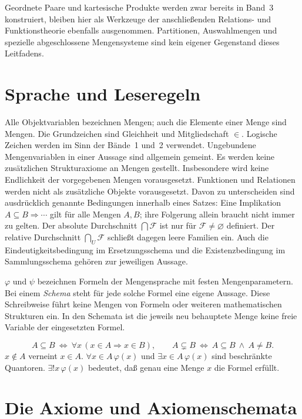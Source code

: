 Geordnete Paare und kartesische Produkte werden zwar bereits in Band~3
konstruiert, bleiben hier als Werkzeuge der anschließenden
Relations- und Funktionstheorie ebenfalls ausgenommen.
Partitionen, Auswahlmengen und spezielle abgeschlossene
Mengensysteme sind kein eigener Gegenstand dieses Leitfadens.

\section{Sprache und Leseregeln}

Alle Objektvariablen bezeichnen Mengen; auch die Elemente einer Menge
sind Mengen. Die Grundzeichen sind Gleichheit und Mitgliedschaft
$\in$. Logische Zeichen werden im Sinn der Bände~1 und~2 verwendet.
Ungebundene Mengenvariablen in einer Aussage sind allgemein gemeint.
Es werden keine zusätzlichen Strukturaxiome an Mengen gestellt.
Insbesondere wird keine Endlichkeit der vorgegebenen Mengen
vorausgesetzt. Funktionen und Relationen werden nicht als zusätzliche
Objekte vorausgesetzt.
Davon zu unterscheiden sind ausdrücklich genannte Bedingungen innerhalb
eines Satzes: Eine Implikation $A\subseteq B\Rightarrow\cdots$ gilt
für alle Mengen $A,B$; ihre Folgerung allein braucht nicht immer zu gelten.
Der absolute Durchschnitt $\bigcap\mathcal F$ ist nur für
$\mathcal F\ne\varnothing$ definiert. Der relative Durchschnitt
$\bigcap_U\mathcal F$ schließt dagegen leere Familien ein.
Auch die Eindeutigkeitsbedingung im Ersetzungsschema und die
Existenzbedingung im Sammlungsschema gehören zur jeweiligen Aussage.

$\varphi$ und $\psi$ bezeichnen Formeln der Mengensprache mit
festen Mengenparametern. Bei einem \emph{Schema} steht für jede
solche Formel eine eigene Aussage. Diese Schreibweise führt
keine Mengen von Formeln oder weiteren mathematischen Strukturen ein.
In den Schemata ist die jeweils neu behauptete Menge keine freie
Variable der eingesetzten Formel.

\begin{definition}
\[
 A\subseteq B\ \Longleftrightarrow\
       \forall x\,(x\in A\Rightarrow x\in B),\qquad
 A\subsetneq B\ \Longleftrightarrow\ A\subseteq B\ \land\ A\ne B.
\]
$x\notin A$ verneint $x\in A$.
$\forall x\in A\,\varphi(x)$ und $\exists x\in A\,\varphi(x)$
sind beschränkte Quantoren. $\exists!x\,\varphi(x)$ bedeutet,
daß genau eine Menge $x$ die Formel erfüllt.
\end{definition}

\section{Die Axiome und Axiomenschemata}
\label{b03guide:sec:axioms}

